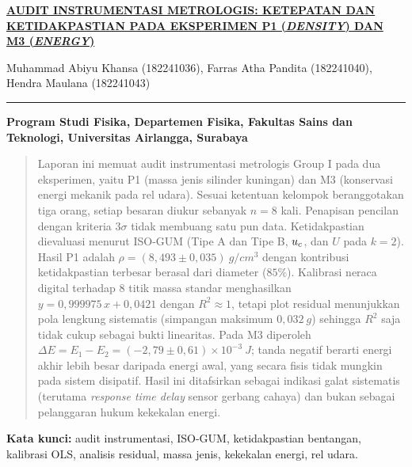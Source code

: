 \begin{center}
    \underline{\textbf{AUDIT INSTRUMENTASI METROLOGIS: KETEPATAN DAN}} \\
    \underline{\textbf{KETIDAKPASTIAN PADA EKSPERIMEN P1 (\textit{DENSITY}) DAN M3 (\textit{ENERGY})}}
\end{center}

\begin{center}
    Muhammad Abiyu Khansa (182241036), Farras Atha Pandita (182241040), Hendra Maulana (182241043)
\end{center}

\hrule height 2pt

\begin{center}
    \textbf{Program Studi Fisika, Departemen Fisika, Fakultas Sains dan Teknologi, Universitas Airlangga, Surabaya}
\end{center}

\vspace{10pt}
\renewcommand{\abstractname}{\normalsize{ABSTRAK}}
\begin{abstract}
\noindent
Laporan ini memuat audit instrumentasi metrologis Group I pada dua eksperimen, yaitu P1 (massa jenis silinder kuningan) dan M3 (konservasi energi mekanik pada rel udara). Sesuai ketentuan kelompok beranggotakan tiga orang, setiap besaran diukur sebanyak $n=8$ kali. Penapisan pencilan dengan kriteria $3\sigma$ tidak membuang satu pun data. Ketidakpastian dievaluasi menurut ISO-GUM (Tipe A dan Tipe B, $\uc$, dan $U$ pada $k=2$). Hasil P1 adalah $\rho=(8{,}493\pm0{,}035)\ \si{g/cm^3}$ dengan kontribusi ketidakpastian terbesar berasal dari diameter ($85\%$). Kalibrasi neraca digital terhadap $8$ titik massa standar menghasilkan $y=0{,}999975\,x+0{,}0421$ dengan $R^2\approx 1$, tetapi plot residual menunjukkan pola lengkung sistematis (simpangan maksimum $0{,}032\ \si{g}$) sehingga $R^2$ saja tidak cukup sebagai bukti linearitas. Pada M3 diperoleh $\Delta E=E_1-E_2=(-2{,}79\pm0{,}61)\times10^{-3}\ \si{J}$; tanda negatif berarti energi akhir lebih besar daripada energi awal, yang secara fisis tidak mungkin pada sistem disipatif. Hasil ini ditafsirkan sebagai indikasi galat sistematis (terutama \textit{response time delay} sensor gerbang cahaya) dan bukan sebagai pelanggaran hukum kekekalan energi.
\end{abstract}

\vspace{5pt}
\noindent\textbf{Kata kunci:} audit instrumentasi, ISO-GUM, ketidakpastian bentangan, kalibrasi OLS, analisis residual, massa jenis, kekekalan energi, rel udara.
